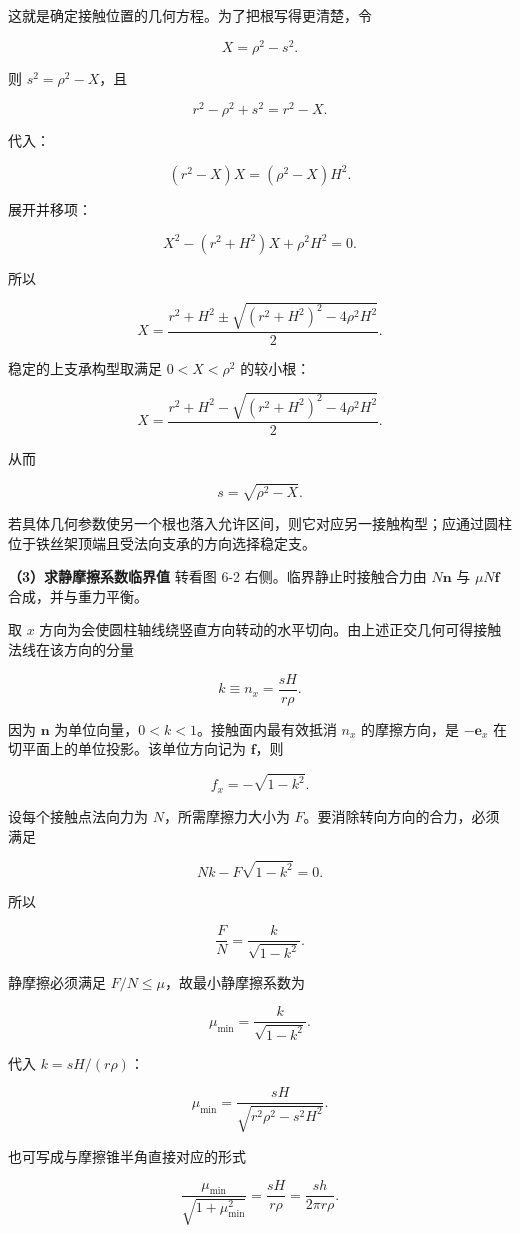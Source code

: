 \documentclass[12pt,a4paper,UTF8]{ctexart}
\begin{document}
这就是确定接触位置的几何方程。为了把根写得更清楚，令

\[X=\rho^2-s^2.\]

则 \(s^2=\rho^2-X\)，且

\[r^2-\rho^2+s^2=r^2-X.\]

代入：

\[(r^2-X)X=(\rho^2-X)H^2.\]

展开并移项：

\[X^2-(r^2+H^2)X+\rho^2H^2=0.\]

所以

\[X=\frac{r^2+H^2\pm
\sqrt{(r^2+H^2)^2-4\rho^2H^2}}{2}.\]

稳定的上支承构型取满足 \(0<X<\rho^2\) 的较小根：

\[\boxed{
X=\frac{r^2+H^2-
\sqrt{(r^2+H^2)^2-4\rho^2H^2}}{2}
}.\]

从而

\[\boxed{s=\sqrt{\rho^2-X}}.\]

若具体几何参数使另一个根也落入允许区间，则它对应另一接触构型；应通过圆柱位于铁丝架顶端且受法向支承的方向选择稳定支。

\textbf{（3）求静摩擦系数临界值} 转看图 6-2 右侧。临界静止时接触合力由
\(N\bm n\) 与 \(\mu N\bm f\) 合成，并与重力平衡。

取 \(x\)
方向为会使圆柱轴线绕竖直方向转动的水平切向。由上述正交几何可得接触法线在该方向的分量

\[\boxed{
k\equiv n_x=\frac{sH}{r\rho}
}.\]

因为 \(\bm n\) 为单位向量，\(0<k<1\)。接触面内最有效抵消 \(n_x\)
的摩擦方向，是 \(-\bm e_x\) 在切平面上的单位投影。该单位方向记为
\(\bm f\)，则

\[f_x=-\sqrt{1-k^2}.\]

设每个接触点法向力为 \(N\)，所需摩擦力大小为
\(F\)。要消除转向方向的合力，必须满足

\[Nk-F\sqrt{1-k^2}=0.\]

所以

\[\frac FN=\frac{k}{\sqrt{1-k^2}}.\]

静摩擦必须满足 \(F/N\le\mu\)，故最小静摩擦系数为

\[\boxed{
\mu_{\min}=\frac{k}{\sqrt{1-k^2}}
}.\]

代入 \(k=sH/(r\rho)\)：

\[\boxed{
\mu_{\min}=
\frac{sH}{\sqrt{r^2\rho^2-s^2H^2}}
}.\]

也可写成与摩擦锥半角直接对应的形式

\[\boxed{
\frac{\mu_{\min}}{\sqrt{1+\mu_{\min}^2}}
=\frac{sH}{r\rho}
=\frac{sh}{2\pi r\rho}
}.\]
\end{document}
